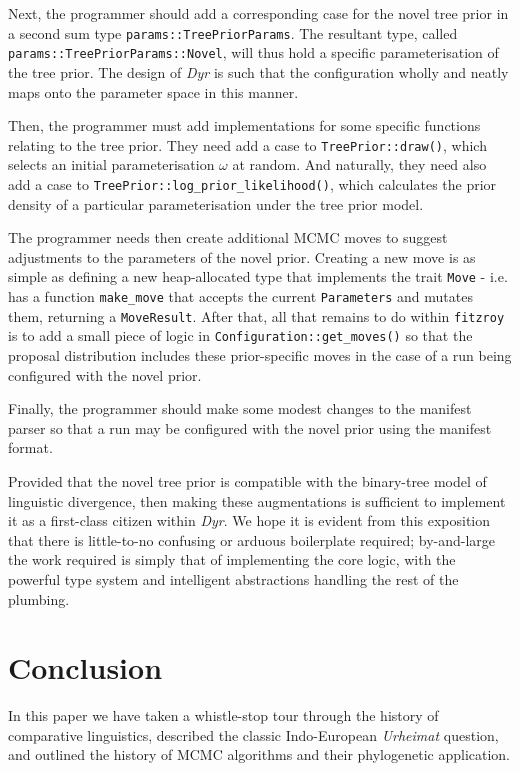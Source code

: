 \documentclass[10pt,journal,compsoc]{IEEEtran}
\begin{document}
Next, the programmer should add a corresponding case for the novel tree prior in a second sum type \texttt{params::TreePriorParams}. The resultant type, called \texttt{params::TreePriorParams::Novel}, will thus hold a specific parameterisation of the tree prior. The design of \textit{Dyr} is such that the configuration wholly and neatly maps onto the parameter space in this manner.

Then, the programmer must add implementations for some specific functions relating to the tree prior. They need add a case to \texttt{TreePrior::draw()}, which selects an initial parameterisation $\omega$ at random. And naturally, they need also add a case to \texttt{TreePrior::log\_prior\_likelihood()}, which calculates the prior density of a particular parameterisation under the tree prior model.

The programmer needs then create additional MCMC moves to suggest adjustments to the parameters of the novel prior. Creating a new move is as simple as defining a new heap-allocated type that implements the trait \texttt{Move} - i.e. has a function \texttt{make\_move} that accepts the current \texttt{Parameters} and mutates them, returning a \texttt{MoveResult}. After that, all that remains to do within \texttt{fitzroy} is to add a small piece of logic in \texttt{Configuration::get\_moves()} so that the proposal distribution includes these prior-specific moves in the case of a run being configured with the novel prior.

Finally, the programmer should make some modest changes to the manifest parser so that a run may be configured with the novel prior using the manifest format.

Provided that the novel tree prior is compatible with the binary-tree model of linguistic divergence, then making these augmentations is sufficient to implement it as a first-class citizen within \textit{Dyr}. We hope it is evident from this exposition that there is little-to-no confusing or arduous boilerplate required; by-and-large the work required is simply that of implementing the core logic, with the powerful type system and intelligent abstractions handling the rest of the plumbing.

\section{Conclusion}\label{sec:conclusion}

In this paper we have taken a whistle-stop tour through the history of comparative linguistics, described the classic Indo-European \textit{Urheimat} question, and outlined the history of MCMC algorithms and their phylogenetic application.
\end{document}
